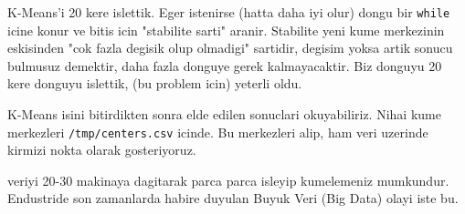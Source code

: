 \documentclass[12pt,fleqn]{article}\usepackage{../common}
\begin{document}
K-Means'i 20 kere islettik. Eger istenirse (hatta daha iyi olur) dongu bir
\verb!while! icine konur ve bitis icin "stabilite sarti"
aranir. Stabilite yeni kume merkezinin eskisinden "cok fazla degisik olup
olmadigi" sartidir, degisim yoksa artik sonucu bulmusuz demektir, daha
fazla donguye gerek kalmayacaktir. Biz donguyu 20 kere donguyu islettik,
(bu problem icin) yeterli oldu.

K-Means isini bitirdikten sonra elde edilen sonuclari okuyabiliriz. Nihai
kume merkezleri \verb!/tmp/centers.csv! icinde. Bu merkezleri alip,
ham veri uzerinde kirmizi nokta olarak gosteriyoruz.

veriyi 20-30 makinaya dagitarak parca parca isleyip kumelemeniz
mumkundur. Endustride son zamanlarda habire duyulan Buyuk Veri (Big Data)
olayi iste bu.
\end{document}

